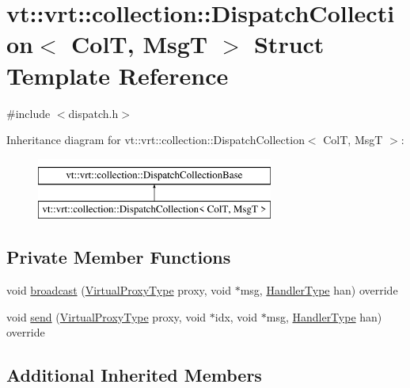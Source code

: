 \hypertarget{structvt_1_1vrt_1_1collection_1_1_dispatch_collection}{}\section{vt\+:\+:vrt\+:\+:collection\+:\+:Dispatch\+Collection$<$ ColT, MsgT $>$ Struct Template Reference}
\label{structvt_1_1vrt_1_1collection_1_1_dispatch_collection}


{\ttfamily \#include $<$dispatch.\+h$>$}

Inheritance diagram for vt\+:\+:vrt\+:\+:collection\+:\+:Dispatch\+Collection$<$ ColT, MsgT $>$\+:\begin{figure}[H]
\begin{center}
\leavevmode
\includegraphics[height=2.000000cm]{structvt_1_1vrt_1_1collection_1_1_dispatch_collection}
\end{center}
\end{figure}
\subsection*{Private Member Functions}
\begin{DoxyCompactItemize}
\item 
void \hyperlink{structvt_1_1vrt_1_1collection_1_1_dispatch_collection_a3f109eb8fdd56e3292b674243996bca4}{broadcast} (\hyperlink{namespacevt_a1b417dd5d684f045bb58a0ede70045ac}{Virtual\+Proxy\+Type} proxy, void $\ast$msg, \hyperlink{namespacevt_af64846b57dfcaf104da3ef6967917573}{Handler\+Type} han) override
\item 
void \hyperlink{structvt_1_1vrt_1_1collection_1_1_dispatch_collection_a4ecf34d64875a926061d3bec61f24871}{send} (\hyperlink{namespacevt_a1b417dd5d684f045bb58a0ede70045ac}{Virtual\+Proxy\+Type} proxy, void $\ast$idx, void $\ast$msg, \hyperlink{namespacevt_af64846b57dfcaf104da3ef6967917573}{Handler\+Type} han) override
\end{DoxyCompactItemize}
\subsection*{Additional Inherited Members}


